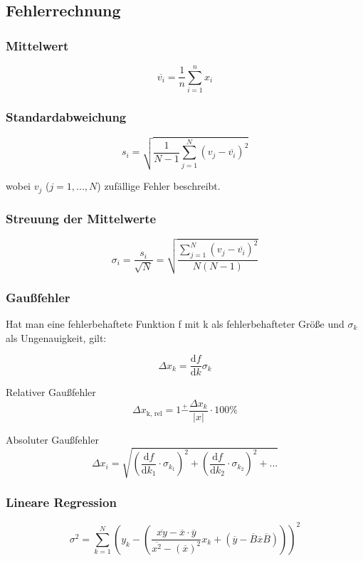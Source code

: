 \subsection{Fehlerrechnung}
\label{subsec:fehlerrechnung}

\subsubsection{Mittelwert}
\begin{equation}
\overline{v_i} = \frac{1}{n} \sum_{i=1}^n x_i
\end{equation}

\subsubsection{Standardabweichung}
\begin{equation}
s_i = \sqrt{\frac{1}{N - 1} \sum_{j=1}^N \left(v_j - \overline{v_i}\right)^2}
\end{equation}

wobei $v_j$ ($j = 1, ..., N$) zufällige Fehler beschreibt.

\subsubsection{Streuung der Mittelwerte}
\begin{equation}
\sigma_i = \frac{s_i}{\sqrt{N}} = \sqrt{\frac{\sum_{j=1}^N \left(v_j - \overline{v_i}\right)^2}{N \left(N - 1 \right)}}
\end{equation}

\subsubsection{Gaußfehler}
Hat man eine fehlerbehaftete Funktion f mit k als fehlerbehafteter Größe und $\sigma_k$ als Ungenauigkeit, gilt:

\begin{equation}
\Delta x_k = \frac{\mathrm{d}f}{\mathrm{d}k}\sigma_k
\end{equation}

Relativer Gaußfehler
\begin{equation}
\Delta x_\text{k, rel} = 1 \stackrel{+}{-} \frac{\Delta x_k}{|x|}\cdot 100\%
\end{equation}

Absoluter Gaußfehler
\begin{equation}
\Delta x_i = \sqrt{\left(\frac{\mathrm{d}f}{\mathrm{d}k_{1}}\cdot \sigma_{k_{1}}\right)^2 + \left(\frac{\mathrm{d}f}{\mathrm{d}k_{2}}\cdot \sigma_{k_{2}}\right)^2 + ...}
\end{equation}

\subsubsection{Lineare Regression}
\begin{equation}
\sigma ^2 = \sum_{k=1}^N \left(y_k - \left(\frac{\overline{xy} - \overline{x}\cdot\overline{y}}{\overline{x^2} - (\overline{x})^2}x_k + \left(\overline{y} - \overline{B}\overline{x}\overline{B}\right)\right)\right)^2
\end{equation}
